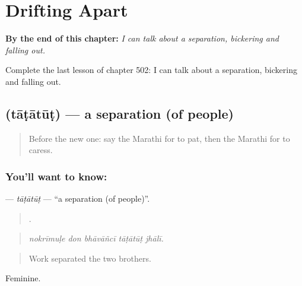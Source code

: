 
\chapter{Drifting Apart}
\label{ch:mr-drifting-apart}

\begin{chapteropening}
\textbf{By the end of this chapter:} \emph{I can talk about a separation, bickering and falling out.}

Complete the last lesson of chapter 502: I can talk about a separation, bickering and falling out.
\end{chapteropening}

\section[\texorpdfstring{\mr{ताटातूट} (tāṭātūṭ)}{ताटातूट (tāṭātūṭ)}]{ (tāṭātūṭ) — a separation (of people)}

\label{lesson:MR-C502-tatatut}



\begin{quote}
Before the new one: say the Marathi for to pat, then the Marathi for to caress.
\end{quote}

\subsection*{You'll want to know: }
\textbf{} — \emph{tāṭātūṭ} — \textquotedblleft{}a separation (of people)\textquotedblright{}.

\begin{quote}
    .
\end{quote}

\begin{quote}
\emph{nokrīmuḷe don bhāvāñcī tāṭātūṭ jhālī.}
\end{quote}

\begin{quote}
Work separated the two brothers.
\end{quote}

Feminine.

